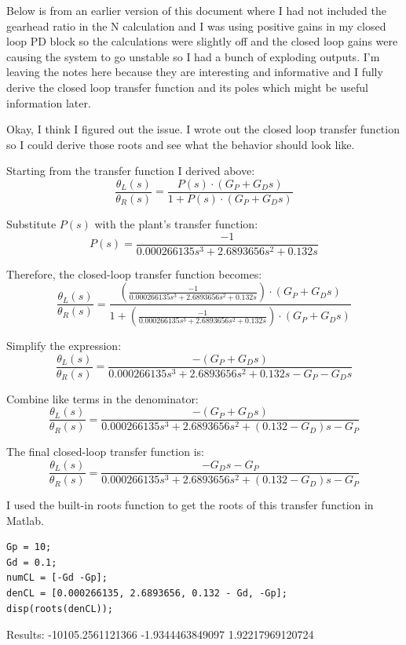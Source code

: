 \documentclass{article}
\begin{document}
\bigskip

Below is from an earlier version of this document where I had not included the gearhead ratio in the N calculation and I was using positive gains in my closed loop PD block so the calculations were slightly off and the closed loop gains were causing the system to go unstable so I had a bunch of exploding outputs.
I'm leaving the notes here because they are interesting and informative and I fully derive the closed loop transfer function and its poles which might be useful information later.

\bigskip

Okay, I think I figured out the issue.
I wrote out the closed loop transfer function so I could derive those roots and see what the behavior should look like.

Starting from the transfer function I derived above:
\[
\frac{\theta_L(s)}{\theta_R(s)} = \frac{P(s) \cdot (G_P + G_D s)}{1 + P(s) \cdot (G_P + G_D s)}
\]

Substitute \(P(s)\) with the plant's transfer function:
\[
P(s) = \frac{-1}{0.000266135 s^3 + 2.6893656 s^2 + 0.132 s}
\]

Therefore, the closed-loop transfer function becomes:
\[
\frac{\theta_L(s)}{\theta_R(s)} = \frac{\left(\frac{-1}{0.000266135 s^3 + 2.6893656 s^2 + 0.132 s}\right) \cdot (G_P + G_D s)}{1 + \left(\frac{-1}{0.000266135 s^3 + 2.6893656 s^2 + 0.132 s}\right) \cdot (G_P + G_D s)}
\]

Simplify the expression:
\[
\frac{\theta_L(s)}{\theta_R(s)} = \frac{-(G_P + G_D s)}{0.000266135 s^3 + 2.6893656 s^2 + 0.132 s - G_P - G_D s}
\]

Combine like terms in the denominator:
\[
\frac{\theta_L(s)}{\theta_R(s)} = \frac{-(G_P + G_D s)}{0.000266135 s^3 + 2.6893656 s^2 + (0.132 - G_D) s - G_P}
\]

The final closed-loop transfer function is:
\[
\frac{\theta_L(s)}{\theta_R(s)} = \frac{-G_D s - G_P}{0.000266135 s^3 + 2.6893656 s^2 + (0.132 - G_D) s - G_P}
\]

I used the built-in roots function to get the roots of this transfer function in Matlab.

\begin{lstlisting}[style=matlabstyle]
Gp = 10;
Gd = 0.1;
numCL = [-Gd -Gp];
denCL = [0.000266135, 2.6893656, 0.132 - Gd, -Gp];
disp(roots(denCL));
\end{lstlisting}

Results:
-10105.2561121366
-1.9344463849097
1.92217969120724
\end{document}
